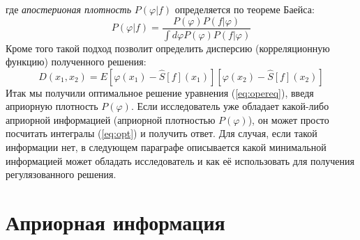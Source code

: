 \noindent  где \textit{апостерионая плотность} $P(\varphi|f)$ определяется по теореме Баейса:
\begin{equation}
P(\varphi|f)= \frac{P(\varphi)P(f|\varphi)}{\int d\varphi P(\varphi)P(f|\varphi)} 
\end{equation}
\noindent Кроме того такой подход позволит определить дисперсию (корреляционную функцию) полученного решения:
\begin{equation}
D(x_1,x_2)  = E[\varphi(x_1) - \hat{S}[f](x_1)][\varphi(x_2) - \hat{S}[f](x_2)]
\end{equation}
Итак мы получили оптимальное решение уравнения (\ref{eq:opereq}), введя априорную плотность $P(\varphi)$. Если исследователь уже обладает какой-либо априорной информацией (априорной плотностью $P(\varphi)$), он может просто посчитать интегралы (\ref{eq:opt}) и получить ответ. Для случая, если такой информации нет, в следующем параграфе описывается какой минимальной информацией может обладать исследователь и как её использовать для получения регулязованного решения.


\section{Априорная информация}
\label{sec:theory:aprior}


